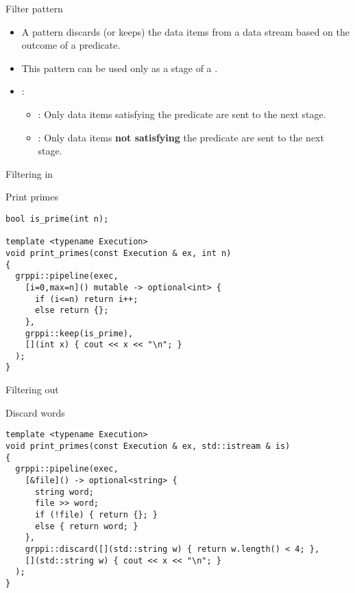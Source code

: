 \begin{frame}[t]{Filter pattern}
\begin{itemize}
  \item A  pattern discards (or keeps) the data items from a 
        data stream based on the outcome of a predicate.
  \item This pattern can be used only as a stage of a .
  \vfill\pause
  \item {}:
    \begin{itemize}
      \item {}: Only data items satisfying the predicate are sent 
            to the next stage.
      \item {}: Only data items \textbf{\alert{not satisfying}} 
            the predicate are sent to the next stage.
    \end{itemize}
\end{itemize}
\end{frame}

\begin{frame}[t,fragile]{Filtering in}
\begin{block}{Print primes}
\begin{lstlisting}
bool is_prime(int n);

template <typename Execution>
void print_primes(const Execution & ex, int n)
{
  grppi::pipeline(exec,
    [i=0,max=n]() mutable -> optional<int> {
      if (i<=n) return i++;
      else return {};
    },
    grppi::keep(is_prime),
    [](int x) { cout << x << "\n"; }
  );
}
\end{lstlisting}
\end{block}
\end{frame}

\begin{frame}[t,fragile]{Filtering out}
\begin{block}{Discard words}
\begin{lstlisting}
template <typename Execution>
void print_primes(const Execution & ex, std::istream & is)
{
  grppi::pipeline(exec,
    [&file]() -> optional<string> {
      string word;
      file >> word;
      if (!file) { return {}; }
      else { return word; }
    },
    grppi::discard([](std::string w) { return w.length() < 4; },
    [](std::string w) { cout << x << "\n"; }
  );
}
\end{lstlisting}
\end{block}
\end{frame}
